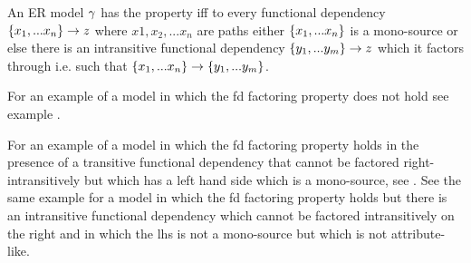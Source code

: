  
\begin{definition}
\noindent An ER model $\gamma$ has the \term{\fdfactoring} property iff to every functional dependency $\left\{x_1,...x_n\right\} \rightarrow z$ where $x1, x_2, ... x_n$  are \reinstatet{\attributelike} paths either $\left\{x_1,...x_n\right\}$ is
a mono-source or else there is an intransitive functional dependency $\left\{y_1,...y_m\right\} \rightarrow z$ which it factors through i.e. such that $\left\{x_1,...x_n\right\} \rightarrow \left\{y_1,...y_m\right\}$. 
\end{definition}

\begin{examples}
For an example of a model in which the fd factoring property does not hold see example .

For an example of a model in which the fd factoring property holds in the presence of a transitive functional dependency that cannot be factored right-intransitively  but which has a left hand side which is a mono-source, see  . 
See the same example for a model in which the fd factoring property holds but there is an intransitive functional dependency which cannot be factored intransitively on the right and in which the lhs is not a mono-source but which is not attribute-like.
\end{examples}



